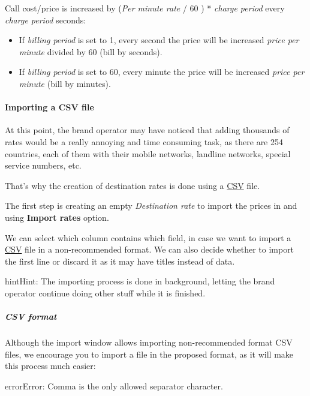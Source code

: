 \documentclass[letterpaper,10pt,english]{sphinxmanual}
\begin{document}
Call cost/price is increased by (\emph{Per minute rate} / 60 ) * \emph{charge period} every \emph{charge period} seconds:
\begin{itemize}
\item {} 
If \emph{billing period} is set to 1, every second the price will be increased
\emph{price per minute} divided by 60 (bill by seconds).

\item {} 
If \emph{billing period} is set to 60, every minute the price will be increased
\emph{price per minute} (bill by minutes).

\end{itemize}


\paragraph{Importing a CSV file}
\label{administration_portal/brand/billing/destination_rates:importing-a-csv-file}
At this point, the brand operator may have noticed that adding thousands
of rates would be a really annoying and time consuming task, as there
are 254 countries, each of them with their mobile networks, landline networks,
special service numbers, etc.

That's why the creation of destination rates is done using a
\href{https://es.wikipedia.org/wiki/CSV}{CSV} file.

The first step is creating an empty \emph{Destination rate} to import the prices in and using \textbf{Import rates} option.

We can select which column contains which field, in case we want to import a
\href{https://es.wikipedia.org/wiki/CSV}{CSV} file in a non-recommended format. We
can also decide whether to import the first line or discard it as it may have
titles instead of data.

\begin{notice}{hint}{Hint:}
The importing process is done in background, letting the brand operator
continue doing other stuff while it is finished.
\end{notice}


\subparagraph{CSV format}
\label{administration_portal/brand/billing/destination_rates:csv-format}
Although the import window allows importing non-recommended format CSV files,
we encourage you to import a file in the proposed format, as it will make
this process much easier:

\begin{notice}{error}{Error:}
Comma is the only allowed separator character.
\end{notice}
\end{document}
